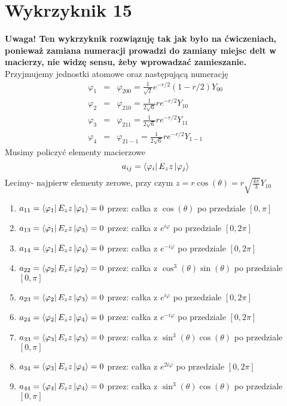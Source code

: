 \documentclass[a4paper,12pt]{article}
\begin{document}
\section{Wykrzyknik 15}
	\textbf{Uwaga! Ten wykrzyknik rozwiązuję tak jak było na ćwiczeniach, ponieważ zamiana numeracji prowadzi do zamiany miejsc delt w macierzy, nie widzę sensu, żeby
	wprowadzać zamieszanie.}\\
	Przyjmujemy jednostki atomowe oraz następującą numerację 
		$$
		\begin{array}{lll}
			\varphi_1 &=& \varphi_{200} = \frac{1}{\sqrt{2}}e^{-r/2}\left(1-r/2\right)Y_{00}\\
			\varphi_2 &=& \varphi_{210} = \frac{1}{2\sqrt{6}}re^{-r/2}Y_{10}\\
			\varphi_3 &=& \varphi_{211} = \frac{1}{2\sqrt{6}}re^{-r/2}Y_{11}\\
			\varphi_4 &=& \varphi_{21-1}= \frac{1}{2\sqrt{6}}re^{-r/2}Y_{1-1}
		\end{array}
		$$
	Musimy policzyć elementy macierzowe 
		$$
		a_{ij} = \bra{\varphi_i}E_z z\ket{\varphi_j}
		$$
	Lecimy- najpierw elementy zerowe, przy czym  $z = r\cos(\theta) = r\sqrt{\frac{4\pi}{3}}Y_{10}$
		\begin{enumerate}
			\item  $a_{11} = \bra{\varphi_1}E_z z\ket{\varphi_1} = 0$ przez: całka z $\cos(\theta)$ po przedziale $[0,\pi]$ 
			\item $a_{13} = \bra{\varphi_1}E_z z\ket{\varphi_3} = 0$ przez: całka z $e^{i\varphi}$ po przedziale $[0,2\pi]$
			\item $a_{14} = \bra{\varphi_1}E_z z\ket{\varphi_4} =0 $ przez:  całka z $e^{-i\varphi}$ po przedziale $[0,2\pi]$
			\item $a_{22} = \bra{\varphi_2}E_z z\ket{\varphi_2} = 0$ przez: całka z $\cos^3(\theta)\sin(\theta)$ po przedziale $[0,\pi]$ 
			\item $a_{23} = \bra{\varphi_2}E_z z\ket{\varphi_3} = 0$ przez: całka z $e^{i\varphi}$ po przedziale $[0,2\pi]$
			\item $a_{24} = \bra{\varphi_2}E_z z\ket{\varphi_4} = 0$ przez: całka z $e^{-i\varphi}$ po przedziale $[0,2\pi]$
			\item $a_{33} = \bra{\varphi_3}E_z z\ket{\varphi_3} = 0$ przez: całka z $\sin^3(\theta)\cos(\theta)$ po przedziale $[0,\pi]$
			\item $a_{34} = \bra{\varphi_3}E_z z\ket{\varphi_4} = 0$ przez: całka z $e^{2i\varphi}$ po przedziale $[0,2\pi]$
			\item $a_{44} = \bra{\varphi_4}E_z z\ket{\varphi_4} = 0$ przez: całka z $\sin^3(\theta)\cos(\theta)$ po przedziale $[0,\pi]$
		\end{enumerate}
\end{document}

